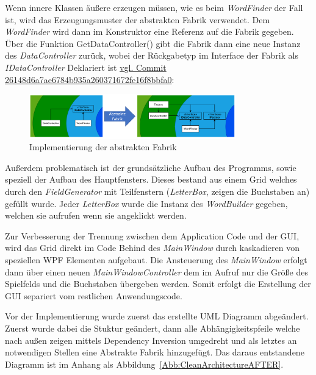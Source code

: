 Wenn innere Klassen äußere erzeugen müssen, wie es beim \textit{WordFinder} der Fall ist, wird das Erzeugungsmuster der abstrakten Fabrik verwendet. Dem \textit{WordFinder} wird dann im Konstruktor eine Referenz auf die Fabrik gegeben. Über die Funktion \glqq GetDataController()\grqq{} gibt die Fabrik dann eine neue Instanz des \textit{DataController} zurück, wobei der Rückgabetyp im Interface der Fabrik als \textit{IDataController} Deklariert ist \href{https://github.com/EinToni/Wortfinder/commit/26148d6a7ae6784b935a260371672fe16f8bbfa0}{vgl. Commit 26148d6a7ae6784b935a260371672fe16f8bbfa0}:

\begin{figure}[!ht]
  \centering
  \includegraphics[width=0.8\textwidth]{Bilder/AbstrakteFabrik.PNG}
  \caption{Implementierung der abstrakten Fabrik}
  \label{Abb:AbstrakteFabrik}
\end{figure}

Außerdem problematisch ist der grundsätzliche Aufbau des Programms, sowie speziell der Aufbau des Hauptfensters. Dieses bestand aus einem Grid welches durch den \textit{FieldGenerator} mit Teilfenstern (\textit{LetterBox}, zeigen die Buchstaben an) gefüllt wurde. Jeder \textit{LetterBox} wurde die Instanz des \textit{WordBuilder} gegeben, welchen sie aufrufen wenn sie angeklickt werden.


Zur Verbesserung der Trennung zwischen dem Application Code und der GUI, wird das Grid direkt im Code Behind des \textit{MainWindow} durch kaskadieren von speziellen WPF  Elementen aufgebaut. Die Ansteuerung des \textit{MainWindow} erfolgt dann über einen neuen \textit{MainWindowController} dem im Aufruf nur die Größe des Spielfelds und die Buchstaben übergeben werden. Somit erfolgt die Erstellung der GUI separiert vom restlichen Anwendungscode.


Vor der Implementierung wurde zuerst das erstellte UML Diagramm abgeändert. Zuerst wurde dabei die Stuktur geändert, dann alle Abhängigkeitspfeile welche nach außen zeigen mittels Dependency Inversion umgedreht und als letztes an notwendigen Stellen eine Abstrakte Fabrik hinzugefügt. Das daraus entstandene Diagramm ist im Anhang als Abbildung~\ref{Abb:CleanArchitectureAFTER}.


